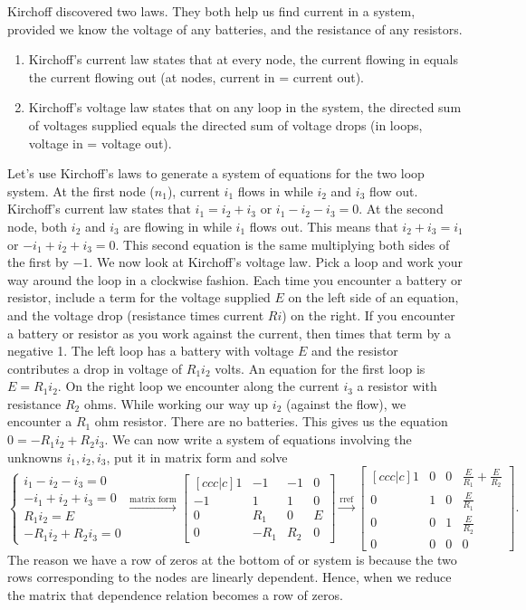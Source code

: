 \documentclass[10pt]{article}
\begin{document}
Kirchoff discovered two laws. They both help us find current in a system, provided we know the voltage of any batteries, and the resistance of any resistors. 
\begin{enumerate}
	\item Kirchoff's current law states that at every node, the current flowing in equals the current flowing out (at nodes, current in = current out). 
	\item Kirchoff's voltage law states that on any loop in the system, the directed sum of voltages supplied equals the directed sum of voltage drops (in loops, voltage in = voltage out). 
\end{enumerate}

Let's use Kirchoff's laws to generate a system of equations for the two loop system. At the first node ($n_1$), current $i_1$ flows in while $i_2$ and $i_3$ flow out. Kirchoff's current law states that $i_1=i_2+i_3$ or $i_1-i_2-i_3=0$.  At the second node, both $i_2$ and $i_3$ are flowing in while $i_1$ flows out. This means that $i_2+i_3=i_1$ or $-i_1+i_2+i_3=0$. This second equation is the same multiplying both sides of the first by $-1$.  
We now look at Kirchoff's voltage law. Pick a loop and work your way around the loop in a clockwise fashion. Each time you encounter a battery or resistor, include a term for the voltage supplied $E$ on the left side of an equation, and the voltage drop (resistance times current $Ri$) on the right. If you encounter a battery or resistor as you work against the current, then times that term by a negative 1. The left loop has a battery with voltage $E$ and the resistor contributes a drop in voltage of $R_1 i_2$ volts.  An equation for the first loop is $E=R_1i_2$. On the right loop we encounter along the current $i_3$ a resistor with resistance $R_2$ ohms.  While working our way up $i_2$ (against the flow), we encounter a $R_1$ ohm resistor.  There are no batteries. This gives us the equation $0=-R_1 i_2 +R_2i_3$. We can now write a system of equations involving the unknowns $i_1,i_2,i_3$, put it in matrix form and solve
$$\begin{cases}
i_1-i_2-i_3=0\\
-i_1+i_2+i_3=0\\
R_1i_2=E\\
-R_1 i_2 +R_2i_3=0
\end{cases}
\xrightarrow{\text{matrix form}}
\begin{bmatrix}[ccc|c]
1&-1&-1&0\\
-1&1&1&0\\
0&R_1&0&E\\
0&-R_1&R_2&0
\end{bmatrix}
\xrightarrow{\text{rref}}
\begin{bmatrix}[ccc|c]
1&0&0&\frac{E}{R_1}+\frac{E}{R_2}\\
0&1&0&\frac{E}{R_1}\\
0&0&1&\frac{E}{R_2}\\
0&0&0&0
\end{bmatrix}.
$$
The reason we have a row of zeros at the bottom of or system is because the two rows corresponding to the nodes are linearly dependent.  Hence, when we reduce the matrix that dependence relation becomes a row of zeros.
\end{document}
